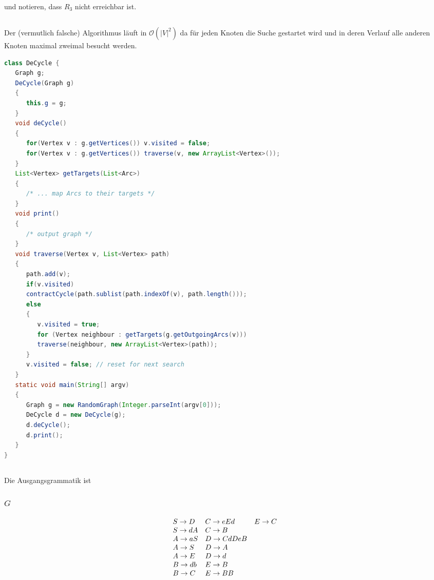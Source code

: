 \documentclass{article}
\begin{document}
und notieren, dass $R_3$ nicht erreichbar ist.

\subsection{} 


Der (vermutlich falsche) Algorithmus l\"auft in $\mathcal{O}\left(|V|^2\right)$
da f\"ur jeden Knoten die Suche gestartet wird und in deren Verlauf alle anderen
Knoten maximal zweimal besucht werden.
\begin{lstlisting}[language=Java]
class DeCycle {
   Graph g;
   DeCycle(Graph g) 
   { 
      this.g = g;
   }
   void deCycle()
   {
      for(Vertex v : g.getVertices()) v.visited = false;
      for(Vertex v : g.getVertices()) traverse(v, new ArrayList<Vertex>());
   }
   List<Vertex> getTargets(List<Arc>)
   {
      /* ... map Arcs to their targets */
   }
   void print()
   {
      /* output graph */
   }
   void traverse(Vertex v, List<Vertex> path)
   {
      path.add(v);
      if(v.visited) 
      contractCycle(path.sublist(path.indexOf(v), path.length()));
      else
      {
         v.visited = true;
         for (Vertex neighbour : getTargets(g.getOutgoingArcs(v)))
         traverse(neighbour, new ArrayList<Vertex>(path));
      }
      v.visited = false; // reset for next search
   }
   static void main(String[] argv)
   {
      Graph g = new RandomGraph(Integer.parseInt(argv[0]));
      DeCycle d = new DeCycle(g);
      d.deCycle();
      d.print();
   }
}
\end{lstlisting}

\subsection{} 

Die Ausgangsgrammatik ist

\subsubsection{$G$}
\begin{align*}
\begin{array}{lll}
   S \rightarrow D & C \rightarrow eEd & E \rightarrow C \\
   S \rightarrow dA & C \rightarrow B \\
   A \rightarrow aS & D \rightarrow CdDeB \\
   A \rightarrow S & D \rightarrow A \\
   A \rightarrow E & D \rightarrow d \\
   B \rightarrow db & E \rightarrow B \\
   B \rightarrow C & E \rightarrow BB
\end{array}
\end{align*}
\end{document}
